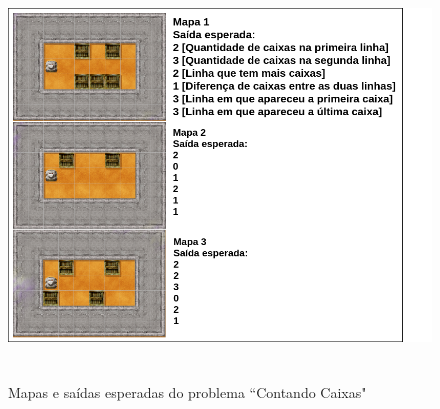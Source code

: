 \begin{figure}[h]
\centering
\caption{Mapas e saídas esperadas do problema ``Contando Caixas"}
\includegraphics[height=10cm]{figuras/map_caso.png}
\label{fig:problem}
\end{figure}

